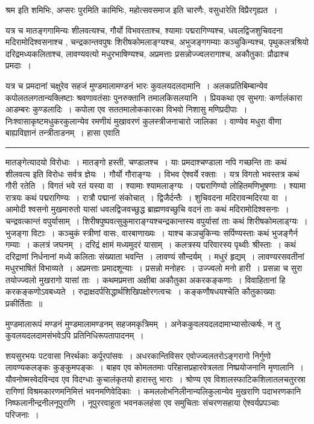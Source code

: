 \documentclass[11pt, openany]{book}
\begin{document}
\newpage

\noindent
श्रम इति शमिभिः, अप्सरः पुरमिति कामिभिः, महोत्सवसमाज इति चारणैः, वसुधारेति विप्रैरगृह्यत~।

यत्र च मातङ्गगामिन्यः शीलवत्यश्च, गौर्यो विभवरताश्च, श्यामाः पद्मरागिण्यश्च, धवलद्विजशुचिवदना मदिरामोदिश्वसनाश्च , चन्द्रकान्तवपुषः शिरीषकोमलाङ्ग्यश्च, अभुजङ्गगम्याः कञ्चुकिन्यश्च, पृथुकलत्रश्रियो दरिद्रमध्यकलिताश्च, लावण्यवत्यो मधुरभाषिण्यश्च, अप्रमत्ताः प्रसन्नोज्ज्वलरागाश्च, अकौतुका: प्रौढाश्च प्रमदाः~।

यत्र च प्रमदानां चक्षुरेव सहजं मुण्डमालामण्डनं भारः कुवलयदलदामानि~। अलकप्रतिबिम्बान्येव कपोलतलगतान्यक्लिष्टाः श्रवणावतंसाः पुनरुक्तानि तमालकिसलयानि~। प्रियकथा एव सुभगा: कर्णालंकारा आडम्बरः कुण्डलादिः~। कपोला एव सततमालोककारका विभवो निशासु मणिप्रदीपाः~। निःश्वासाकृष्टमधुकरकुलान्येव रमणीयं मुखावरणं कुलस्त्रीजनाचारो जालिका~। वाण्येव मधुरा वीणा बाह्यविज्ञानं तन्त्रीताडनम्~। हासा एवाति\textendash

\vspace{2mm}
\hrule

{\s मातङ्गेत्यादयो विरोधाः~। मातङ्गो हस्ती, चण्डालश्च~। याः प्रमदाश्चण्डाला नपि गच्छन्ति ताः कथं शीलवत्य इति विरोधः सर्वत्र ज्ञेयः~। गौर्यो गौराङ्ग्यः~। विभव ऐश्वर्ये रक्ताः~। यत्र विगतो भवस्तत्र कथं गौरी रतेति~। विगतं भवे रतं यस्या वा~। श्यामाः श्यामलाङ्ग्यः~। पद्मरागिण्यो लोहितमणिभूषणाः~। श्यामा रात्रयः कथं पद्मरागिण्यः~। रात्रौ पद्मानां संकोचात्~। द्विजैर्दन्तैः~। शुचिवदना मदिरावन्मदिरया वा~। आमोदी श्वसनो मुखमारुतो यासां धवलद्विजवच्छुद्ध ब्राह्मणवच्छुचि वदनं ताः कथं मदिरामोदिश्वसनाः~। चन्द्रवत्कान्तं वपुर्यासाम्~। शिरीषपुष्पवत्सुकुमाराङ्ग्यश्चन्द्रकान्तस्य वपुर्यासां ताः कथं शिरीषकोमलाड्ग्यः~। भुजङ्गा विटाः~। कञ्चुकं स्त्रीणां वासः, वारबाणाख्यः~। याश्च कञचुकिन्यः सर्पिण्यस्ताः कथं भुजङ्गैर्न गम्याः~। कलत्रं जघनम्~। दरिद्रं क्षामं मध्यमुदरं यासाम्~। कलत्रस्य परिवारस्य पृथ्वीः श्रीस्ताः~। कथं दरिद्राणां निर्धनानां मध्ये कलिताः संख्याता भवन्ति~। लावण्यं सौन्दर्यम्~। मधुरं हृद्यम्~। लावण्यरसवतीनां मधुरभाषितं विभाव्यते~। अप्रमत्ताः प्रमादशून्याः~। प्रसन्नो मनोहरः~। उज्ज्वलो मनो हारी~। प्रसन्ना च सुरा तयोज्ज्वलो मुखरागो यासां ताः~। कथमप्रमत्ता अक्षीबा अकौतुका अकरकङ्कणाः~। विवाहितानां हि करकङ्कणोऽवबध्यते~। {\qt रुद्राक्षदर्पसिद्धार्थशिखिपक्षोरगत्वचः~। कङ्कणौषधयश्चेति कौतुकाख्याः प्रकीर्तिताः~॥}

मुण्डमालारूपं मण्डनं मुण्डमालामण्डनम् सहजमकृत्रिमम्~। अनेककुवलयदलदामाभ्यासोत्कर्षः, न तु कुवलयदलदामसंभवेऽपि प्रतिनिधिरूपतापादनम्~।}

\newpage

\noindent
शयसुरभयः पटवासा निरर्थकाः कर्पूरपांसवः~। अधरकान्तिविसर एवोज्ज्वलतरोऽङ्गरागो निर्गुणो लावण्यकलङ्कः कुङ्कुमपङ्कः~। बाहव एव कोमलतमाः परिहासप्रहारवेत्रलता निष्प्रयोजनानि मृणालानि~। यौवनोष्मस्वेदविन्दव एव विदग्धाः कुचालंकृतयो हारास्तु भाराः~। श्रोण्य एव विशालस्फाटिकशिलातलचतुरस्रा रागिणां विश्रमकारणमनिमित्तं भवनमणिवेदिकाः~। कमललोभनिलीनान्यलिकुलान्येव मुखराणि पदाभरणकानि निष्फलानीन्द्रनीलनूपुराणि~। नूपुररवाहूता भवनकलहंसा एव समुचिताः संचरणसहाया ऐश्वर्यप्रपञ्चाः परिजनाः~।
\end{document}
